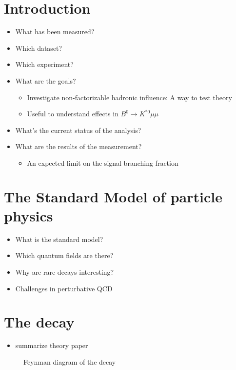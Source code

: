 
\chapter{Introduction} %

\begin{itemize}
  \item What has been measured?
  \item Which dataset?
  \item Which experiment?
  \item What are the goals? 
    \begin{itemize}
      \item Investigate non-factorizable hadronic influence: A way to test theory
      \item Useful to understand effects in $B^0\to K^{*0}\mu\mu$
    \end{itemize}
  \item What's the current status of the analysis?
  \item What are the results of the measurement?
    \begin{itemize}
      \item An expected limit on the signal branching fraction
    \end{itemize}
\end{itemize}

\chapter{The Standard Model of particle physics} %

\begin{itemize}
  \item What is the standard model?
  \item Which quantum fields are there?
  \item Why are rare decays interesting?
  \item Challenges in perturbative QCD
\end{itemize}

\chapter{The decay \boldmath\decay} %

\begin{itemize}
  \item summarize theory paper
\end{itemize}

\begin{figure}
  \centering
  \missingfigure[figwidth=\textwidth]{}
  \caption{Feynman diagram of the decay}
\end{figure}


